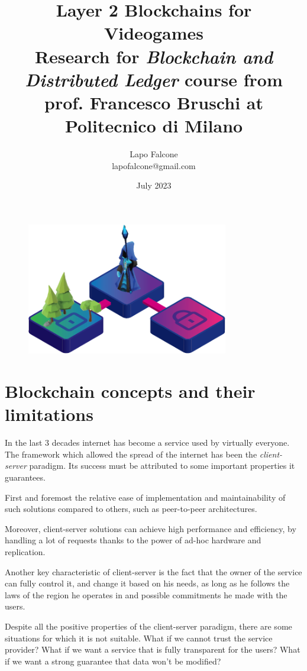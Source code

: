 \documentclass[12pt]{article}
\title{\Huge \textbf{Layer 2 Blockchains for Videogames}\\\normalsize Research for \emph{Blockchain and Distributed Ledger} course from prof. Francesco Bruschi at Politecnico di Milano}
\author{\Large Lapo Falcone\\\normalsize lapofalcone@gmail.com}
\date{July 2023}
\begin{document}
\maketitle
\begin{figure}[ht]
    \centering
    \includegraphics[width=250pt]{logo}
    \label{figure:logo}
\end{figure}
\newpage
\null
\newpage
\tableofcontents
\newpage

\part{Blockchain concepts and their limitations} \label{part:bcatl}
In the last 3 decades internet has become a service used by virtually everyone. The framework which allowed the spread of the internet has been the \textit{client-server} paradigm.
Its success must be attributed to some important properties it guarantees. 

First and foremost the relative ease of implementation and maintainability of such solutions compared to others, such as peer-to-peer architectures.

Moreover, client-server solutions can achieve high performance and efficiency, by handling a lot of requests thanks to the power of ad-hoc hardware and replication. 

Another key characteristic of client-server is the fact that the owner of the service can fully control it, and change it based on his needs, as long as he follows the laws of the region he operates in and possible commitments he made with the users.

Despite all the positive properties of the client-server paradigm, there are some situations for which it is not suitable. 
What if we cannot trust the service provider? What if we want a service that is fully transparent for the users? What if we want a strong guarantee that data won't be modified?
\end{document}
